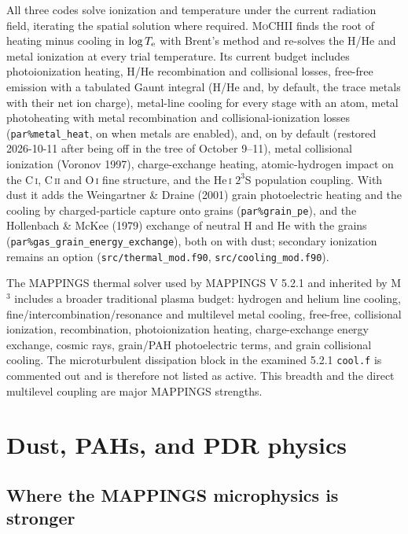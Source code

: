 \documentclass[english,a4paper]{my_memo}
\newcommand{\code}[1]{\texttt{#1}}
\newcommand{\MoCHII}{\textsc{MoCHII}}
\newcommand{\Mthree}{M$^3$}
\newcommand{\Mappings}{MAPPINGS V 5.2.1}
\newcommand{\Te}{T_{\rm e}}
\begin{document}
All three codes solve ionization and temperature under the current
radiation field, iterating the spatial solution where required.  \MoCHII{}
finds the root of heating minus cooling in
$\log \Te$ with Brent's method and re-solves the H/He and metal ionization at every trial
temperature.  Its current budget includes photoionization heating,
H/He recombination and collisional losses, free-free emission with a
tabulated Gaunt integral (H/He and, by default, the trace metals with
their net ion charge), metal-line cooling for every stage with an atom,
metal photoheating with metal recombination and collisional-ionization
losses (\code{par\%metal\_heat}, on when metals are enabled), and, on by
default (restored 2026-10-11 after being off in the tree of October 9--11), metal
collisional ionization (Voronov 1997), charge-exchange heating,
atomic-hydrogen impact on the C\,\textsc{i}, C\,\textsc{ii} and
O\,\textsc{i} fine structure, and the He\,\textsc{i} $2^3$S population
coupling.  With dust it adds the Weingartner \& Draine (2001) grain
photoelectric heating and the cooling by charged-particle capture onto
grains (\code{par\%grain\_pe}), and the Hollenbach \& McKee (1979) exchange
of neutral H and He with the grains (\code{par\%gas\_grain\_energy\_exchange}),
both on with dust; secondary ionization remains an option
(\code{src/thermal\_mod.f90}, \code{src/cooling\_mod.f90}).

The MAPPINGS thermal solver used by \Mappings{} and inherited by \Mthree{}
includes a broader traditional plasma budget:
hydrogen and helium line cooling, fine/intercombination/resonance and
multilevel metal cooling, free-free, collisional ionization,
recombination, photoionization heating, charge-exchange energy exchange,
cosmic rays, grain/PAH photoelectric terms, and grain collisional cooling.
The microturbulent dissipation block in the examined 5.2.1
\code{cool.f} is commented out and is therefore not listed as active.
This breadth and the direct multilevel coupling are major MAPPINGS
strengths.

\section{Dust, PAHs, and PDR physics}

\subsection{Where the MAPPINGS microphysics is stronger}
\end{document}
